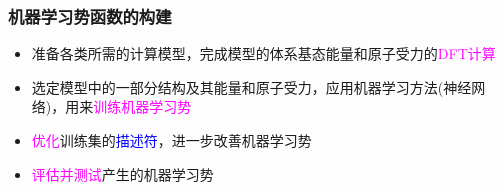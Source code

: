 \begin{frame}
	\frametitle{机器学习势函数的构建}
	\begin{itemize}
		\item 准备各类所需的计算模型，完成模型的体系基态能量和原子受力的\textcolor{magenta}{\textrm{DFT}计算}
		\item 选定模型中的一部分结构及其能量和原子受力，应用机器学习方法(神经网络)，用来\textcolor{magenta}{训练机器学习势}
		\item \textcolor{magenta}{优化}训练集的\textcolor{blue}{描述符}，进一步改善机器学习势
		\item \textcolor{magenta}{评估并测试}产生的机器学习势
	\end{itemize}
\end{frame}
	
